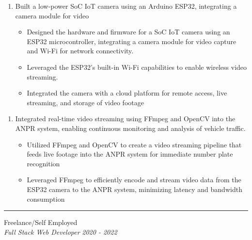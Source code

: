 \documentclass{article}
\begin{document}
\begin{enumerate}
    \item[] Built a low-power SoC IoT camera using an Arduino ESP32, integrating a camera module for video
   \begin{itemize}
    \item Designed the hardware and firmware for a SoC IoT camera using an ESP32 microcontroller, integrating a camera module for video capture and Wi-Fi for network connectivity.
    \item Leveraged the ESP32's built-in Wi-Fi capabilities to enable wireless video streaming. 
    \item Integrated the camera with a cloud platform for remote access, live streaming, and storage of video footage
   \end{itemize}
\end{enumerate}



\begin{enumerate}
    \item[] Integrated real-time video streaming using FFmpeg and OpenCV into the ANPR system, enabling continuous monitoring and analysis of vehicle traffic.
   \begin{itemize}
    \item Utilized FFmpeg and OpenCV to create a video streaming pipeline that feeds live footage into the ANPR system for immediate number plate recognition
    \item Leveraged FFmpeg to efficiently encode and stream video data from the ESP32 camera to the ANPR system, minimizing latency and bandwidth consumption
   \end{itemize}
\end{enumerate}




\vspace{1.4em}
\hrule 
\vspace{0.4em}
\hspace{-2.em}
{\bf}Freelance/Self Employed  \hfill {} \\%
{\em Full Stack Web Developer } \hfill {\em 2020 - 2022 } %
\subsection*{}
\vspace{-2.6em}
\end{document}
